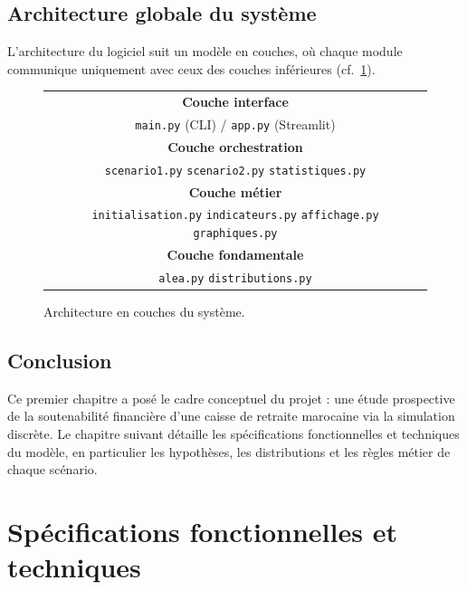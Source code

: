 \documentclass[12pt,a4paper,oneside]{report}
\newcommand{\code}[1]{\texttt{\color{primary}#1}}
\begin{document}
\section{Architecture globale du système}

L'architecture du logiciel suit un modèle en couches, où chaque module
communique uniquement avec ceux des couches inférieures
(cf.~\cref{fig:architecture}).

\begin{figure}[H]
  \centering
  \begin{tabular}{|c|}
    \hline
    \textbf{Couche interface} \\
    \code{main.py} (CLI) \quad / \quad \code{app.py} (Streamlit) \\
    \hline
    \textbf{Couche orchestration} \\
    \code{scenario1.py} \quad \code{scenario2.py} \quad
    \code{statistiques.py} \\
    \hline
    \textbf{Couche métier} \\
    \code{initialisation.py} \quad \code{indicateurs.py} \quad
    \code{affichage.py} \quad \code{graphiques.py} \\
    \hline
    \textbf{Couche fondamentale} \\
    \code{alea.py} \quad \code{distributions.py} \\
    \hline
  \end{tabular}
  \caption{Architecture en couches du système.}
  \label{fig:architecture}
\end{figure}

\section{Conclusion}

Ce premier chapitre a posé le cadre conceptuel du projet : une étude
prospective de la soutenabilité financière d'une caisse de retraite
marocaine via la simulation discrète. Le chapitre suivant détaille les
spécifications fonctionnelles et techniques du modèle, en particulier
les hypothèses, les distributions et les règles métier de chaque
scénario.

\chapter{Spécifications fonctionnelles et techniques}
\end{document}
